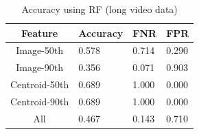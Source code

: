\begin{table}[b]
  \centering
  \caption{Accuracy using RF (long video data)}
    \begin{tabular}{clll} \hline
      Feature       & Accuracy & FNR   & FPR   \\ \hline \hline
      Image-50th    & 0.578    & 0.714 & 0.290  \\
      Image-90th    & 0.356    & 0.071 & 0.903 \\
      Centroid-50th & 0.689    & 1.000 & 0.000 \\
      Centroid-90th & 0.689    & 1.000 & 0.000 \\
      All           & 0.467    & 0.143 & 0.710  \\ \hline
    \end{tabular}
  \label{result_rf_test}
\end{table}

